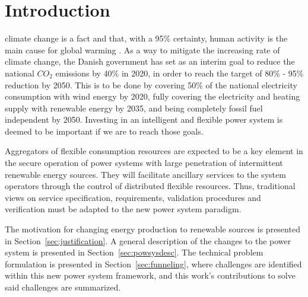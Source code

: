 \chapter{Introduction}
 climate change is a fact and that, with a 95\% certainty, human activity is the main cause for global warming . As a way to mitigate the increasing rate of climate change, the Danish government has set as an interim goal to reduce the national $CO_2$ emissions by 40\% in 2020, in order to reach the target of 80\% - 95\% reduction by 2050. This is to be done by covering 50\% of the national electricity consumption with wind energy by 2020, fully covering the electricity and heating supply with renewable energy by 2035, and being completely fossil fuel independent by 2050. Investing in an intelligent and flexible power system is deemed to be important if we are to reach those goals.

Aggregators of flexible consumption resources are expected to be a key element in the secure operation of power systems with large penetration of intermittent renewable energy sources. They will facilitate ancillary services to the system operators through the control of distributed flexible resources. Thus, traditional views on service specification, requirements, validation procedures and verification must be adapted to the new power system paradigm. 

The motivation for changing energy production to renewable sources is presented in Section~\ref{sec:justification}. A general description of the changes to the power system is presented in Section~\ref{sec:powsysdesc}. The technical problem formulation is presented in Section~\ref{sec:funneling}, where challenges are identified within this new power system framework, and this work's contributions to solve said challenges are summarized.
